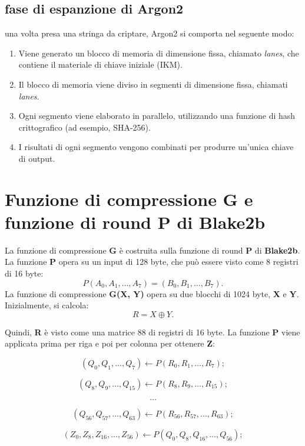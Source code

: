 \documentclass[a4paper,12pt]{report}
\begin{document}
		\subsection*{fase di espanzione di Argon2}
		una volta presa una stringa da criptare, Argon2 si comporta nel seguente modo:
		\begin{enumerate}
			\item Viene generato un blocco di memoria di dimensione fissa, chiamato
			\textit{lanes}, che contiene il materiale di chiave iniziale (IKM).
			\item Il blocco di memoria viene diviso in segmenti di dimensione fissa,
			chiamati \textit{lanes}.
			\item Ogni segmento viene elaborato in parallelo, utilizzando una funzione
			di hash crittografico (ad esempio, SHA-256).
			\item I risultati di ogni segmento vengono combinati per produrre un'unica
			chiave di output.
		\end{enumerate}
		\section*{Funzione di compressione G e funzione di round P di Blake2b}

			La funzione di compressione \textbf{G} è costruita sulla funzione di
			round \textbf{P} di \textbf{Blake2b}. La funzione \textbf{P} opera su un
			input di 128 byte, che può essere visto come 8 registri di 16 byte:\cite{argon2}
			\[
			P(A_0, A_1, \dots, A_7) = (B_0, B_1, \dots, B_7).
			\]
			La funzione di compressione \textbf{G(X, Y)} opera su due blocchi di
			1024 byte, \textbf{X} e \textbf{Y}. Inizialmente, si calcola:
			\[
			R = X \oplus Y.
			\]

			Quindi, \textbf{R} è visto come una matrice 88 di registri di 16 byte.
			La funzione \textbf{P} viene applicata prima per riga e poi per colonna
			per ottenere \textbf{Z}:

			\[
			(Q_0, Q_1, \dots, Q_7) \leftarrow P(R_0, R_1, \dots, R_7);
			\]

			\[
			(Q_8, Q_9, \dots, Q_{15}) \leftarrow P(R_8, R_9, \dots, R_{15});
			\]

			\[
			\ldots
			\]

			\[
			(Q_{56}, Q_{57}, \dots, Q_{63}) \leftarrow P(R_{56}, R_{57}, \dots, R_{63});
			\]

			\[
			(Z_0, Z_8, Z_{16}, \dots, Z_{56}) \leftarrow P(Q_0, Q_8, Q_{16}, \dots, Q_{56});
			\]
\end{document}
